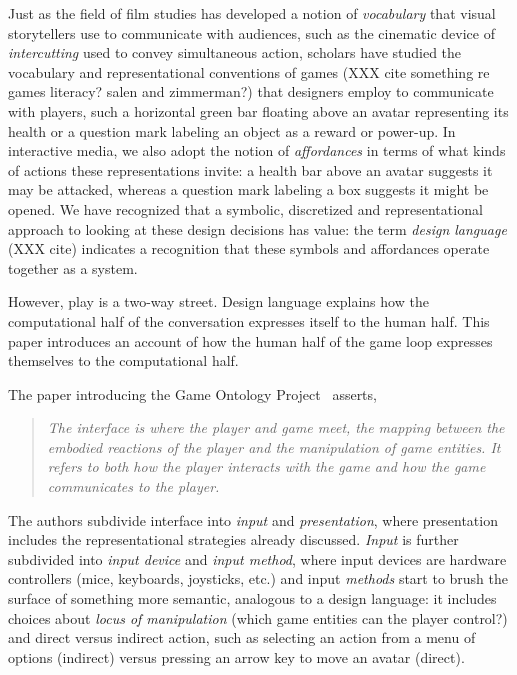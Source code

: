 \documentclass[sigconf]{acmart}
\begin{document}
Just as the field of film studies has developed a notion of {\em
vocabulary} that visual storytellers use to communicate with audiences,
such as the cinematic device of {\em intercutting} used to convey
simultaneous action,
scholars have studied the vocabulary and representational conventions of
games (XXX cite something re games literacy? salen and zimmerman?) that
designers employ to communicate with players, such a horizontal green bar
floating above an avatar representing its health or a question mark
labeling an object as a reward or power-up. In interactive media, we also
adopt the notion of {\em affordances} in terms of what kinds of actions
these representations invite: a health bar above an avatar suggests it may
be attacked, whereas a question mark labeling a box suggests it might be
opened.
%
We have recognized that a symbolic, discretized and representational
approach to looking at these design decisions has value: the term {\em
design language} (XXX cite) indicates a recognition that these symbols and
affordances operate together as a system.

However, play is a two-way street. Design language explains how the computational half of
the conversation expresses itself to the human half. This paper introduces
an account of how the human half of the game loop expresses themselves to
the computational half.

The paper introducing the Game Ontology Project~\cite{zagal2007towards} asserts,
\begin{quote} \em
The interface is where the player and game meet, the mapping
between the embodied reactions of the player and the manipulation of game
entities. It refers to both how the player interacts with the game and how
the game communicates to the player.
\end{quote}
The authors subdivide interface into {\em input} and {\em presentation},
where presentation includes the representational strategies already
discussed. {\em Input} is further subdivided into {\em input device} and
{\em input method}, where input devices are hardware controllers (mice,
keyboards, joysticks, etc.) and input {\em methods} start to brush the
surface of something more semantic, analogous to a design language: it
includes choices about {\em locus of manipulation} (which game entities can
the player control?) and direct versus indirect action, such as selecting
an action from a menu of options (indirect) versus pressing an arrow key to
move an avatar (direct).
\end{document}
